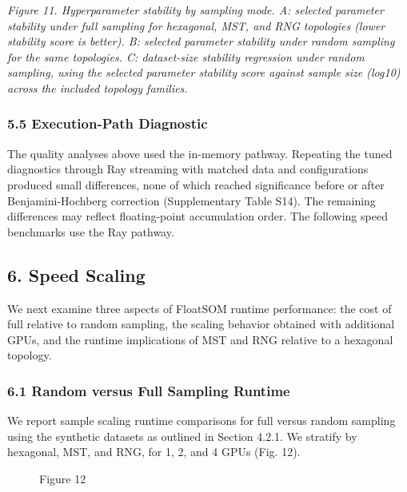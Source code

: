 \documentclass[
]{article}
\makeatletter
\newcounter{none} %
\newcommand*\pandocbounded[1]{%
  \sbox\pandoc@box{#1}%
  \Gscale@div\@tempa{\textheight}{\dimexpr\ht\pandoc@box+\dp\pandoc@box\relax}%
  \Gscale@div\@tempb{\linewidth}{\wd\pandoc@box}%
  \ifdim\@tempb\p@<\@tempa\p@\let\@tempa\@tempb\fi%
  \ifdim\@tempa\p@<\p@\scalebox{\@tempa}{\usebox\pandoc@box}%
  \else\usebox{\pandoc@box}%
  \fi%
}
\providecommand{\DIFadd}[1]{{\protect\color{blue} #1}} %
\providecommand{\DIFaddbegin}{} %
\providecommand{\DIFaddend}{} %
\providecommand{\DIFaddFL}[1]{\DIFadd{#1}} %
\providecommand{\DIFaddbeginFL}{} %
\providecommand{\DIFaddendFL}{} %
\makeatother
\begin{document}
 \DIFaddbegin \pandocbounded{}
\DIFaddend \emph{Figure  \DIFaddbegin \DIFadd{11. }\DIFaddend Hyperparameter stability by sampling mode. A: selected
parameter stability under full sampling for hexagonal, MST, and RNG
topologies (lower stability score is better). B: selected parameter
stability under random sampling for the same topologies. C: dataset-size
stability regression under random sampling, using the selected parameter
stability score against sample size (log10) across the included topology
families.}

\DIFaddbegin \subsubsection{\DIFadd{5.5 Execution-Path
Diagnostic}}\label{execution-path-diagnostic}

\DIFadd{The quality analyses above used the in-memory pathway. Repeating the
tuned diagnostics through Ray streaming with matched data and
configurations produced small differences, none of which reached
significance before or after Benjamini-Hochberg correction
(Supplementary Table S14). The remaining differences may reflect
floating-point accumulation order. The following speed benchmarks use
the Ray pathway.
}

\DIFaddend \subsection{6. Speed Scaling}\label{speed-scaling}

We next examine three aspects of FloatSOM runtime performance: the cost
of full relative to random sampling, the scaling behavior obtained with
additional GPUs, and the runtime implications of MST and RNG relative to
a hexagonal topology.

\subsubsection{6.1 Random versus Full Sampling
Runtime}\label{random-versus-full-sampling-runtime}

We report sample scaling runtime comparisons for full versus random
sampling using the synthetic datasets as outlined in Section 4.2.1. We
stratify by hexagonal, MST, and RNG, for 1, 2, and 4 GPUs (Fig.  \DIFaddbegin \DIFadd{12}\DIFaddend ).

\begin{figure}
\centering
 \DIFaddbeginFL \pandocbounded{}
\DIFaddendFL \caption{Figure  \DIFaddbeginFL \DIFaddFL{12}\DIFaddendFL }
\end{figure}
\end{document}
